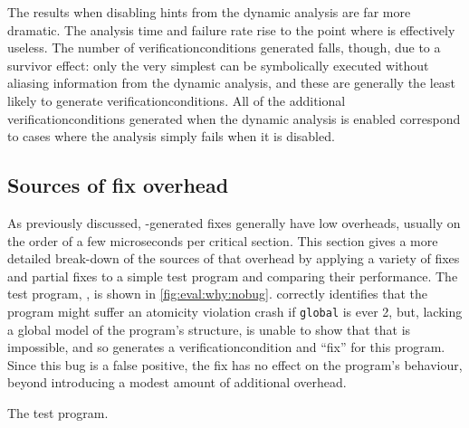 The results when disabling hints from the dynamic analysis are far
more dramatic.  The analysis time and failure rate rise to the point
where {\technique} is effectively useless.  The number of
\glspl{verificationcondition} generated falls, though, due to a
survivor effect: only the very simplest {\StateMachines} can be
symbolically executed without aliasing information from the dynamic
analysis, and these are generally the least likely to generate
\glspl{verificationcondition}.  All of the additional
\glspl{verificationcondition} generated when the dynamic analysis is
enabled correspond to cases where the analysis simply fails when it is
disabled.

\subsection{Sources of fix overhead}
\label{sect:eval:why:fix_overhead}

 As previously discussed, {\technique}-generated
fixes generally have low overheads, usually on the order of a few
microseconds per critical section.  This section gives a more detailed
break-down of the sources of that overhead by applying a variety of
fixes and partial fixes to a simple test program and comparing their
performance.  The test program, , is shown in
\autoref{fig:eval:why:nobug}.  {\Technique} correctly identifies that
the program might suffer an atomicity violation crash if
\texttt{global} is ever 2, but, lacking a global model of the
program's structure, is unable to show that that is impossible, and so
generates a \gls{verificationcondition} and ``fix'' for this program.
Since this bug is a false positive, the fix has no effect on the
program's behaviour, beyond introducing a modest amount of additional
overhead.  

\begin{sanefig}
  {\hfill}
  {\hfill}
  {\hfill}
  \caption{The {\!\rm {}\!} test program.}
  \label{fig:eval:why:nobug}
\end{sanefig}


